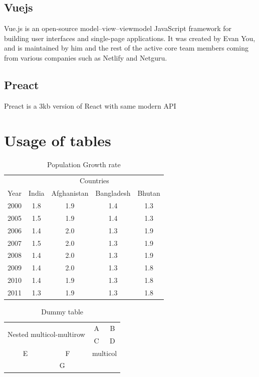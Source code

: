 \documentclass{article}
\begin{document}
 \subsection{Vuejs}
Vue.js is an open-source model–view–viewmodel JavaScript framework for building user interfaces and single-page applications. It was created by Evan You, and is maintained by him and the rest of the active core team members coming from various companies such as Netlify and Netguru.
 \subsection{Preact}
Preact is a 3kb version of React with same modern API

\section{Usage of tables}
\begin{table}[!h] 
\Large
\centering
\begin{tabular}{|c|c|c|c|c|}
\hline
     & \multicolumn{4}{|c|}{Countries}\\
     \cline{2-5}
Year & India & Afghanistan & Bangladesh & Bhutan \\ 
\hline
2000 & 1.8 & 1.9 & 1.4 & 1.3 \\
2005 & 1.5 & 1.9 & 1.4 & 1.3 \\
2006 & 1.4 & 2.0 & 1.3 & 1.9\\
2007 & 1.5 & 2.0 & 1.3 & 1.9 \\
2008 & 1.4 & 2.0 & 1.3 & 1.9 \\
2009 & 1.4 & 2.0 & 1.3 & 1.8 \\
2010 & 1.4 & 1.9 & 1.3 & 1.8 \\
2011 & 1.3 & 1.9 & 1.3 & 1.8 \\
\hline
      
\end{tabular}
\caption{Population Growth rate}
\label{tab:PGR}
\end{table}
\newpage

\begin{table}[!h]
\Large
\centering
\begin{tabular}{|c|c|c|c|c|} %
\hline
\multicolumn{3}{|c|}{\multirow{2}{*}{Nested multicol-multirow}}& A & B \\ 
\cline{4-5}
\multicolumn{3}{|c|}{}&C&D\\
\hline
E&F&\multicolumn{3}{|c|}{multicol}\\
\hline
\multicolumn{5}{|c|}{G}\\  
\hline
\end{tabular}
\caption{Dummy table}
\label{tab:Dummy}
\end{table}
\end{document}
